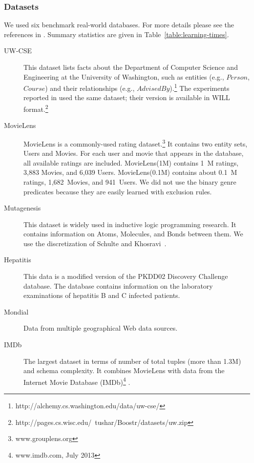 \documentclass[runningheads,a4paper]{llncs}
\begin{document}
\subsubsection{Datasets}
We used six benchmark real-world databases. For more details please see the references in \cite{Schulte2012}. Summary statistics are given in Table~\ref{table:learning-times}.
\begin{description}

\item[UW-CSE] This dataset \cite{Kok2005a} lists facts about the Department of Computer Science and Engineering at the University of Washington, such as entities (e.g., $Person$, $Course$) and their relationships (e.g., $AdvisedBy$).\footnote{http://alchemy.cs.washington.edu/data/uw-cse/} The experiments reported in \cite{Natarajan2012} used the same dataset; their version is available in WILL format.\footnote{http://pages.cs.wisc.edu/~tushar/Boostr/datasets/uw.zip}

\item[MovieLens] MovieLens is a  commonly-used rating dataset.\footnote {www.grouplens.org} %
It contains two entity sets, Users and Movies. For each user and movie that appears in the database, all available ratings are included. MovieLens(1M) contains 1~M ratings, 3,883 Movies, and 6,039 Users. MovieLens(0.1M) contains about 0.1~M ratings, 1,682~Movies, and 941~Users. We did not use the binary genre predicates because they are easily learned with exclusion rules.


\item[Mutagenesis] This dataset is widely used in inductive logic programming research. 
It contains information on Atoms, Molecules, and Bonds between them. We use the discretization of Schulte and Khosravi~\cite{Schulte2012}.

\item[Hepatitis] This data is a modified version of the PKDD02 Discovery Challenge database. %
The database contains information on the laboratory examinations of hepatitis B and C infected patients. 

\item[Mondial] Data from multiple geographical Web data sources. 

\item[IMDb] %
The largest dataset in terms of number of total tuples (more than 1.3M) and schema complexity. %
It combines MovieLens %
with data from the Internet Movie Database (IMDb)\footnote{www.imdb.com, July 2013} \cite{Peralta2007}. 
\end{description}
\end{document}
